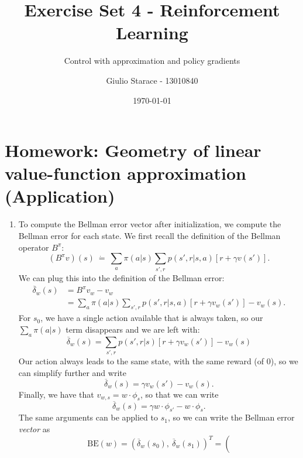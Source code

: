 \documentclass{article}
\title{Exercise Set 4 - Reinforcement Learning}
\subtitle{Control with approximation and policy gradients}
\author{Giulio Starace - 13010840}
\date{\today}
\begin{document}
\maketitle
\section*{Homework: Geometry of linear value-function approximation (Application)}
\begin{enumerate}
	\item \label{q:7.4.1} To compute the Bellman error vector after initialization, we compute the
	      Bellman error for each state. We first recall the definition of the Bellman operator $B^\pi$:
	      \begin{equation}
		      (B^\pi v)(s) ~ \dot{=} ~ \sum_a \pi(a | s) \sum_{s', r} p(s', r | s, a) \left[ r + \gamma
			      v(s') \right].
	      \end{equation}
	      We can plug this into the definition of the Bellman error:
	      \begin{align*}
		      \overline{\delta}_w(s) & = B^\pi v_w - v_w                                       \\
		                             & = \sum_a \pi(a | s) \sum_{s', r} p(s', r | s, a) \left[
			      r + \gamma v_w(s') \right] - v_w(s).
	      \end{align*}
	      For $s_0$, we have a single action available that is always taken, so our $\sum_a
		      \pi(a | s)$ term disappears and we are left with:
	      \begin{equation}
		      \overline{\delta}_w(s) = \sum_{s', r} p(s', r | s) \left[r + \gamma
			      v_w(s') \right] - v_w(s)
	      \end{equation}
	      Our action always leads to the same state, with the same reward (of 0), so we can simplify further
	      and write
	      \begin{equation}
		      \overline{\delta}_w(s) = \gamma v_w(s') - v_w(s).
	      \end{equation}
	      Finally, we have that $v_{w, s} = w \cdot \phi_s$, so that we can write
	      \begin{equation}
		      \overline{\delta}_w(s) = \gamma w \cdot \phi_{s'} - w \cdot \phi_s.
	      \end{equation}
	      The same arguments can be applied to $s_1$, so we can write the Bellman error
	      \textit{vector} as
	      \begin{equation}
		      \text{BE}(w) = \left(\overline{\delta}_w(s_0), ~ \overline{\delta}_w(s_1) \right)^T = \left(

\end{equation}
\end{enumerate}
\end{document}
